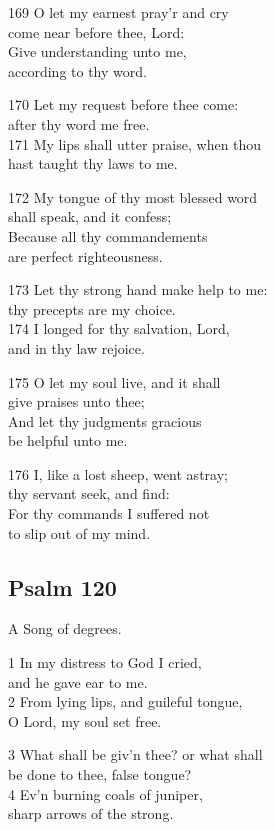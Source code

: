 \begin{multicols}{3}
169 O let my earnest pray’r and cry\\
come near before thee, Lord:\\
Give understanding unto me,\\
according to thy word.

170 Let my request before thee come:\\
after thy word me free.\\
171 My lips shall utter praise, when thou\\
hast taught thy laws to me.

172 My tongue of thy most blessed word\\
shall speak, and it confess;\\
Because all thy commandements\\
are perfect righteousness.

173 Let thy strong hand make help to me:\\
thy precepts are my choice.\\
174 I longed for thy salvation, Lord,\\
and in thy law rejoice.

175 O let my soul live, and it shall\\
give praises unto thee;\\
And let thy judgments gracious\\
be helpful unto me.

176 I, like a lost sheep, went astray;\\
thy servant seek, and find:\\
For thy commands I suffered not\\
to slip out of my mind.

\begin{center}
\quad{}\quad{}
\end{center}


\subsection*{Psalm 120}

A Song of degrees.

1 In my distress to God I cried,\\
and he gave ear to me.\\
2 From lying lips, and guileful tongue,\\
O Lord, my soul set free.

3 What shall be giv’n thee? or what shall\\
be done to thee, false tongue?\\
4 Ev’n burning coals of juniper,\\
sharp arrows of the strong.


\end{multicols}
